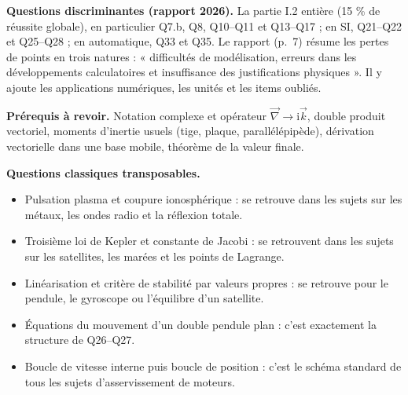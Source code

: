 \documentclass[11pt,a4paper]{article}
\providecommand{\tightlist}{\setlength{\itemsep}{0pt}\setlength{\parskip}{0pt}}
\begin{document}
\textbf{Questions discriminantes (rapport 2026).} La partie I.2 entière (15 \% de réussite globale), en particulier Q7.b, Q8, Q10--Q11 et Q13--Q17 ; en SI, Q21--Q22 et Q25--Q28 ; en automatique, Q33 et Q35. Le rapport (p.~7) résume les pertes de points en trois natures : « difficultés de modélisation, erreurs dans les développements calculatoires et insuffisance des justifications physiques ». Il y ajoute les applications numériques, les unités et les items oubliés.

\textbf{Prérequis à revoir.} Notation complexe et opérateur \(\vec\nabla\to\mathrm i\vec k\), double produit vectoriel, moments d'inertie usuels (tige, plaque, parallélépipède), dérivation vectorielle dans une base mobile, théorème de la valeur finale.

\textbf{Questions classiques transposables.}

\begin{itemize}
\tightlist
\item
  Pulsation plasma et coupure ionosphérique : se retrouve dans les sujets sur les métaux, les ondes radio et la réflexion totale.
\item
  Troisième loi de Kepler et constante de Jacobi : se retrouvent dans les sujets sur les satellites, les marées et les points de Lagrange.
\item
  Linéarisation et critère de stabilité par valeurs propres : se retrouve pour le pendule, le gyroscope ou l'équilibre d'un satellite.
\item
  Équations du mouvement d'un double pendule plan : c'est exactement la structure de Q26--Q27.
\item
  Boucle de vitesse interne puis boucle de position : c'est le schéma standard de tous les sujets d'asservissement de moteurs.
\end{itemize}
\end{document}
